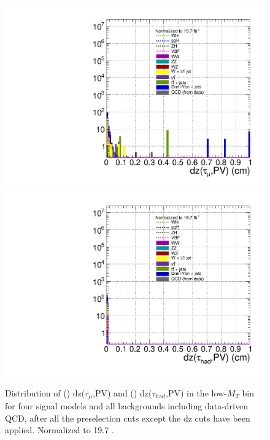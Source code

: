 \begin{figure}[hbtp]
  \begin{center}
    \includegraphics[width=1.2\cmsFigWidth]{figures/sigVsBkg_dztaumu_regA_lowMT_v60}
    \includegraphics[width=1.2\cmsFigWidth]{figures/sigVsBkg_dztauhad_regA_lowMT_v60}
    \caption{Distribution of (\cmsLeft) dz($\tau_{\mu}$,PV) and (\cmsRight) dz($\tau_{\text{had}}$,PV) in the low-$M_{T}$ bin for four signal models and all backgrounds including data-driven QCD, after all the preselection cuts except the dz cuts have been applied. Normalized to 19.7 \fbinv.}
    \label{fig:sigVsBkg_dz_regA_lowMT}
  \end{center}
\end{figure}

